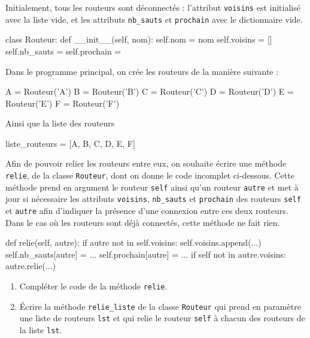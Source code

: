 Initialement, tous les routeurs sont déconnectés : l’attribut \verb|voisins| est initialisé avec la liste vide, et les attributs \verb|nb_sauts| et \verb|prochain| avec le dictionnaire vide.

\begin{CodePythontexAlt}[TaillePolice=\large, Largeur=1\linewidth,Centre,Lignes=true,PremLigne=1]{}
class Routeur: 
    def __init__(self, nom): 
        self.nom = nom
        self.voisins = []
        self.nb_sauts = {}
        self.prochain = {}
    \end{CodePythontexAlt}

Dans le programme principal, on crée les routeurs de la manière suivante :

\begin{CodePythontexAlt}[TaillePolice=\large, Largeur=1\linewidth,Centre,Lignes=true,PremLigne=1]{}
A = Routeur('A') 
B = Routeur('B') 
C = Routeur('C') 
D = Routeur('D') 
E = Routeur('E') 
F = Routeur('F')
    \end{CodePythontexAlt}

Ainsi que la liste des routeurs

\begin{CodePythontexAlt}[TaillePolice=\large, Largeur=1\linewidth,Centre,Lignes=true,PremLigne=1]{}
liste_routeurs = [A, B, C, D, E, F]
    \end{CodePythontexAlt}

    Afin de pouvoir relier les routeurs entre eux, on souhaite écrire une méthode \verb|relie|, de la classe \verb|Routeur|, dont on donne le code incomplet ci-dessous. Cette méthode prend en argument le routeur \verb|self| ainsi qu’un routeur \verb|autre| et met à jour si nécessaire les attributs \verb|voisins|, \verb|nb_sauts| et \verb|prochain| des routeurs \verb|self| et \verb|autre| afin d’indiquer la présence d’une connexion entre ces deux routeurs. Dans le cas où les routeurs sont déjà connectés, cette méthode ne fait rien.

    \begin{CodePythontexAlt}[TaillePolice=\large, Largeur=1\linewidth,Centre,Lignes=true,PremLigne=1]{}
def relie(self, autre): 
    if autre not in self.voisins: 
        self.voisins.append(...) 
        self.nb_sauts[autre] = ... 
        self.prochain[autre] = ... 
        if self not in autre.voisins: 
            autre.relie(...)
    \end{CodePythontexAlt}

    \begin{enumerate}[series=monDS, resume]
        \item Compléter le code de la méthode \verb|relie|.

\medskip

        \item Écrire la méthode \verb|relie_liste| de la classe \verb|Routeur| qui prend en paramètre une liste de routeurs \verb|lst| et qui relie le routeur \verb|self| à chacun des routeurs de la liste \verb|lst|.
        

    \end{enumerate}

